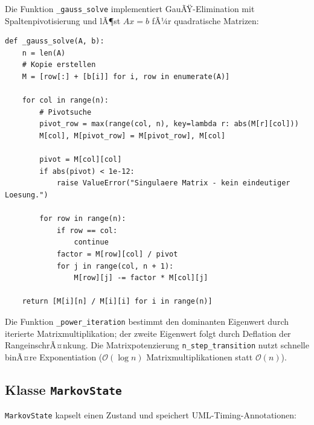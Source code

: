 ﻿\documentclass[a4paper,12pt]{report}
\theoremstyle{definition}
\begin{document}
Die Funktion \texttt{\_gauss\_solve} implementiert GauÃŸ-Elimination mit
Spaltenpivotisierung und lÃ¶st $Ax = b$ fÃ¼r quadratische Matrizen:

\begin{lstlisting}[style=python, caption={GauÃŸ-Elimination mit Spaltenpivotisierung (Kernfunktion)}, label=lst:gauss]
def _gauss_solve(A, b):
    n = len(A)
    # Kopie erstellen
    M = [row[:] + [b[i]] for i, row in enumerate(A)]

    for col in range(n):
        # Pivotsuche
        pivot_row = max(range(col, n), key=lambda r: abs(M[r][col]))
        M[col], M[pivot_row] = M[pivot_row], M[col]

        pivot = M[col][col]
        if abs(pivot) < 1e-12:
            raise ValueError("Singulaere Matrix - kein eindeutiger Loesung.")

        for row in range(n):
            if row == col:
                continue
            factor = M[row][col] / pivot
            for j in range(col, n + 1):
                M[row][j] -= factor * M[col][j]

    return [M[i][n] / M[i][i] for i in range(n)]
\end{lstlisting}

Die Funktion \texttt{\_power\_iteration} bestimmt den dominanten Eigenwert
durch iterierte Matrixmultiplikation; der zweite Eigenwert folgt durch
Deflation der RangeinschrÃ¤nkung. Die Matrixpotenzierung
\texttt{n\_step\_transition} nutzt schnelle binÃ¤re Exponentiation
($\mathcal{O}(\log n)$ Matrixmultiplikationen statt $\mathcal{O}(n)$).

\subsection{Klasse \texttt{MarkovState}}

\texttt{MarkovState} kapselt einen Zustand und speichert UML-Timing-Annotationen:
\end{document}
